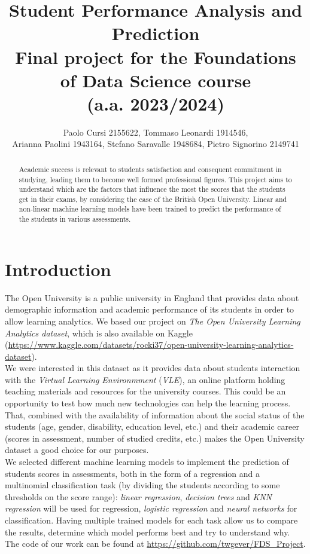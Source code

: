 \documentclass{article}
\title{Student Performance Analysis and Prediction \\ Final project for the Foundations of Data Science course \\(a.a. 2023/2024) }
\author{Paolo Cursi 2155622, Tommaso Leonardi 1914546, \\Arianna Paolini 1943164, Stefano Saravalle 1948684, Pietro Signorino 2149741}
\begin{document}
\maketitle

\begin{abstract}
Academic success is relevant to students satisfaction and consequent commitment in studying, leading them to become well formed professional figures. This project aims to understand which are the factors that influence the most the scores that the students get in their exams, by considering the case of the British Open University. Linear and non-linear machine learning models have been trained to predict the performance of the students in various assessments.
\end{abstract}

\section{Introduction}
The Open University is a public university in England that provides data about demographic information and academic performance of its students in order to allow learning analytics. We based our project on \textit{The Open University Learning Analytics dataset}, which is also available on Kaggle (\url{https://www.kaggle.com/datasets/rocki37/open-university-learning-analytics-dataset}). \\

We were interested in this dataset as it provides data about students interaction with the \textit{Virtual Learning Environmment} (\textit{VLE}), an online platform holding teaching materials and resources for the university courses. This could be an opportunity to test how much new technologies can help the learning process. That, combined with the availability of information about the social status of the students (age, gender, disability, education level, etc.) and their academic career (scores in assessment, number of studied credits, etc.) makes the Open University dataset a good choice for our purposes. \\

We selected different machine learning models to implement the prediction of students scores in assessments, both in the form of a regression and a multinomial classification task (by dividing the students according to some thresholds on the score range): \textit{linear regression}, \textit{decision trees} and \textit{KNN regression} will be used for regression, \textit{logistic regression }and \textit{neural networks} for classification. Having multiple trained models for each task allow us to compare the results, determine which model performs best and try to understand why. The code of our work can be found at \url{https://github.com/twgever/FDS_Project}. %
\end{document}
